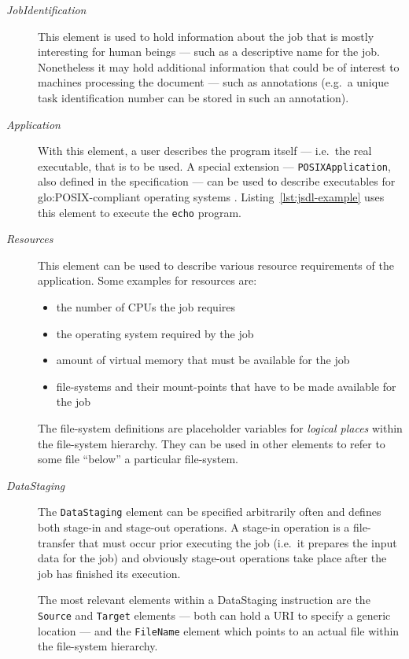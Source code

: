 \begin{description}
\item[\emph{JobIdentification}] This element  is used to hold information
  about the job that is mostly  interesting for human beings --- such as a
  descriptive  name  for the  job.   Nonetheless  it  may hold  additional
  information  that  could  be  of  interest to  machines  processing  the
  document  --- such  as  annotations (e.g.~a  unique task  identification
  number can be stored in such an annotation).
\item[\emph{Application}] With this element,  a user describes the program
  itself  --- i.e.~the real  executable, that  is to  be used.   A special
  extension   ---   \texttt{POSIXApplication},   also   defined   in   the
  specification \cite{jsdl-spec}  --- can be used  to describe executables
  for    \gls{glo:POSIX}-compliant    operating   systems    \cite{posix}.
  Listing~\ref{lst:jsdl-example}   uses  this   element  to   execute  the
  \texttt{echo} program.
\item[\emph{Resources}]  This  element can  be  used  to describe  various
  resource requirements  of the  application. Some examples  for resources
  are:
  \begin{itemize}
  \item the number of CPUs the job requires
  \item the operating system required by the job
  \item amount of virtual memory that must be available for the job
  \item file-systems and their mount-points that have to be made available
    for the job
  \end{itemize}
  The file-system definitions  are placeholder variables for \emph{logical
    places} within  the file-system hierarchy.  They can be used  in other
  elements to refer to some file ``below'' a particular file-system.
\item[\emph{DataStaging}]   The   \texttt{DataStaging}   element  can   be
  specified  arbitrarily often  and  defines both  stage-in and  stage-out
  operations.   A stage-in operation  is a  file-transfer that  must occur
  prior executing  the job (i.e.~it prepares  the input data  for the job)
  and obviously stage-out operations take place after the job has finished
  its execution.

  The  most relevant  elements within  a DataStaging  instruction  are the
  \texttt{Source} and \texttt{Target} elements ---  both can hold a URI to
  specify a  generic location ---  and the \texttt{FileName} element which
  points to an actual file within the file-system hierarchy.
\end{description}

